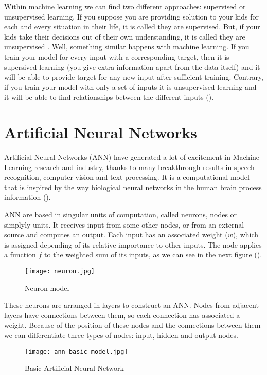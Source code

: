 Within machine learning we can find two different approaches: supervised or unsupervised learning. If you suppose you are providing solution to your kids for each and every situation in their life, it is called they are supervised. But, if your kids take their decisions out of their own understanding, it is called they are unsupervised . Well, something similar happens with machine learning. If you train your model for every input with a corresponding target, then it is supersived learning (you give extra information apart from the data itself) and it will be able to provide target for any new input after sufficient training. Contrary, if you train your model with only a set of inputs it is unsupervised learning and it will be able to find relationships between the different inputs (\cite{sup_unsup_learning}). 

\section{Artificial Neural Networks}
Artificial Neural Networks (ANN) have generated a lot of excitement in Machine Learning research and industry, thanks to many breakthrough results in speech recognition, computer vision and text processing. It is a computational model that is inspired by the way biological neural networks in the human brain process information (\cite{intro_ann}). 

ANN are based in singular units of computation, called neurons, nodes or simplyly units. It receives input from some other nodes, or from an external source and computes an output. Each input has an associated weight ($w$), which is assigned depending of its relative importance to other inputs. The node applies a function $f$ to the weighted sum of its inputs, as we can see in the next figure (\cite{intro_ann}).

\begin{figure}[ht]
	\centering
	\texttt{[image: neuron.jpg]}
	\caption{Neuron model}
\end{figure}

These neurons are arranged in layers to construct an ANN. Nodes from adjacent layers have connections between them, so each connection has associated a weight. Because of the position of these nodes and the connections between them we can differentiate three types of nodes: input, hidden and output nodes. 

\begin{figure}[ht]
	\centering
	\texttt{[image: ann\_basic\_model.jpg]}
	\caption{Basic Artificial Neural Network}
\end{figure}

